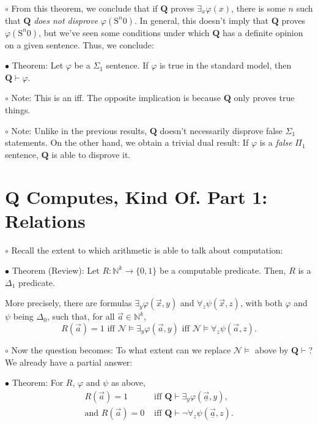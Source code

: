 \documentclass{article}
\newcommand{\N}{\mathbb{N}}
\newcommand{\RQ}{\mathbf{Q}}
\newcommand{\TN}{\mathcal{N}}
\newcommand{\suc}{\mathrm{S}}
\newcommand\Point[1]{\noindent \hspace{\labelsep} {
$\bullet$ #1} \smallskip}
\newcommand\point[1]{\noindent \hspace{\labelsep} {\small $\circ$ #1} \smallskip}
\newcommand\timestamp[1]{}
\begin{document}
\point{From this theorem, we conclude that if $\RQ$ proves $\exists_x \varphi(x)$, there is some $n$ such that $\RQ$ \emph{does not disprove} $\varphi(\suc^n 0)$. In general, this doesn't imply that $\RQ$ proves $\varphi(\suc^n 0)$, but we've seen some conditions under which $\RQ$ has a definite opinion on a given sentence. Thus, we conclude:}

\Point{Theorem: Let $\varphi$ be a $\Sigma_1$ sentence. If $\varphi$ is true in the standard model, then $\RQ \vdash \varphi$.}

\point{Note: This is an iff. The opposite implication is because $\RQ$ only proves true things.}

\point{Note: Unlike in the previous results, $\RQ$ doesn't necessarily disprove false $\Sigma_1$ statements. On the other hand, we obtain a trivial dual result: If $\varphi$ is a \emph{false} $\Pi_1$ sentence, $\RQ$ is able to disprove it.}

\timestamp{63 min}

\section{$\RQ$ Computes, Kind Of. Part 1: Relations}

\point{Recall the extent to which arithmetic is able to talk about computation:}

\Point{Theorem (Review): Let $R \colon \N^k \to \{0,1\}$ be a computable predicate. Then, $R$ is a $\Delta_1$ predicate.

More precisely, there are formulas $\exists_y \varphi(\vec x, y)$ and $\forall_z \psi(\vec x, z)$, with both $\varphi$ and $\psi$ being $\Delta_0$, such that, for all $\vec a \in \N^k$,
\begin{equation}
R(\vec a) = 1 \text{ iff } \TN \vDash \exists_y \varphi(\vec a, y) \text{ iff } \TN \vDash \forall_z \psi(\vec a, z).
\end{equation}}

\point{Now the question becomes: To what extent can we replace $\TN \vDash$ above by $\RQ \vdash$? We already have a partial answer:}

\Point{Theorem: For $R$, $\varphi$ and $\psi$ as above,
\begin{equation}
\begin{aligned}
R(\vec a) = 1 &\text{ iff } \RQ \vdash \exists_y \varphi(\underline{\vec a}, y),\\
\text{and } R(\vec a) = 0 &\text{ iff } \RQ \vdash \neg\forall_z \psi(\underline{\vec a}, z).
\end{aligned}
\end{equation}}
\end{document}
